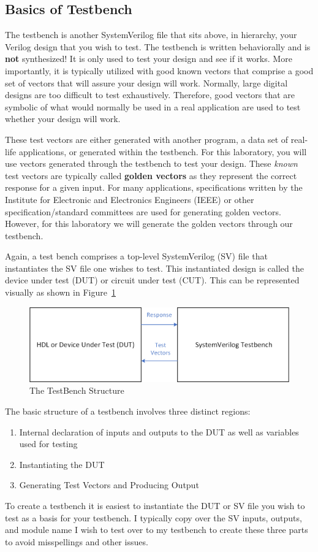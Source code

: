 \documentclass{article}
\begin{document}
\subsection{Basics of Testbench}

The testbench is another SystemVerilog file
that sits above, in hierarchy, your Verilog design that you wish to
test.  The testbench is written behaviorally and is \textbf{not}
synthesized!
It is only used to test your design and see if it works.  More
importantly, it is typically utilized with good known vectors that
comprise a good set of vectors that will assure your design will
work.  Normally, large digital designs are too difficult to test
exhaustively.  Therefore, good vectors that are symbolic of what would
normally be used in a real application are used to test whether your
design will work.

These test vectors are either generated with another program, a data
set of real-life applications, or generated within the testbench.  For
this laboratory, you will use vectors generated through the testbench
to test your design.  These \textit{known} test vectors are typically called
\textbf{golden vectors} as they represent the correct response 
for a given input.  For many applications,
specifications written by the Institute for Electronic and Electronics
Engineers (IEEE) or other specification/standard committees are used for
generating golden vectors.  However, for this laboratory we will
generate the golden vectors through our testbench.

Again, a test bench comprises a top-level SystemVerilog (SV) file that
instantiates the SV file one wishes to test.  This instantiated
design is called the device under test (DUT) or circuit under test
(CUT).  This can be represented visually as shown in Figure~\ref{tb.fig}
\begin{figure}
  \centering
  \includegraphics[scale=0.7]{Testbench.png}
  \caption{The TestBench Structure}
  \label{tb.fig}
\end{figure}

The basic structure of a testbench involves three distinct regions:
\begin{enumerate}
\item Internal declaration of inputs and outputs to the DUT as well as
  variables used for testing
\item Instantiating the DUT
\item Generating Test Vectors and Producing Output
\end{enumerate}
To create a testbench it is easiest to
instantiate the DUT or SV file you wish
to test as a basis for your testbench.  I typically copy over the SV
inputs, outputs, and module name I wish to test over to my testbench to create these
three parts to avoid misspellings and other issues.
\end{document}
